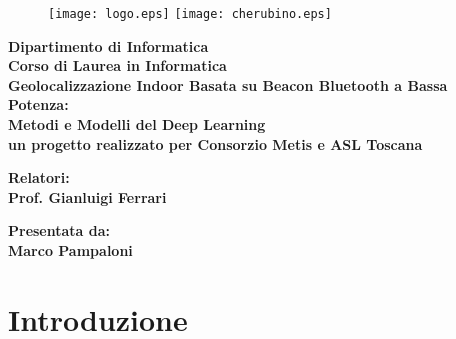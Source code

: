 \documentclass[12pt]{report}
\begin{document}
\begin{titlepage}
\begin{figure}[t]
	\centering\texttt{[image: logo.eps]}
	\vspace{1cm}
    \centering\texttt{[image: cherubino.eps]}
\end{figure}

\begin{center}
	\textbf{ Dipartimento di Informatica\\ Corso di Laurea in Informatica\\}
	\vspace{15mm}
    {\LARGE{\bf Geolocalizzazione Indoor Basata su Beacon Bluetooth a Bassa Potenza:}}\\
	\vspace{3mm}
	{\LARGE{\bf Metodi e Modelli del Deep Learning}}\\
	{{\bf un progetto realizzato per Consorzio Metis e ASL Toscana}} \\
\end{center}

\vspace{20mm}

\begin{minipage}[t]{0.47\textwidth}
	{\large{\bf Relatori:\\ Prof. Gianluigi Ferrari 
	}}
\end{minipage}\hfill\begin{minipage}[t]{0.47\textwidth}\raggedleft
	{\large{\bf Presentata da: \\ Marco Pampaloni \\ }}
\end{minipage}

\vspace{18mm}


\end{titlepage}

\tableofcontents

\begin{abstract}

\end{abstract}

\chapter{Introduzione}
\end{document}
